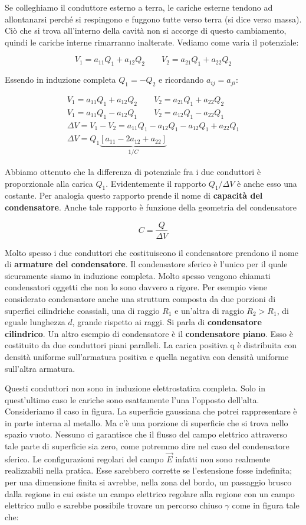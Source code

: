 Se colleghiamo il conduttore esterno a terra, le cariche esterne tendono ad allontanarsi perché si respingono e fuggono tutte verso terra (si dice verso massa). Ciò che si trova all'interno della cavità non si accorge di questo cambiamento, quindi le cariche interne rimarranno inalterate.
Vediamo come varia il potenziale:

\[
	V_1 = a_{11}Q_1 + a_{12}Q_2 \qquad V_2=a_{21}Q_1+a_{22}Q_2
\]

Essendo in induzione completa $ Q_1=-Q_2   $ e ricordando $ a_{ij}=a_{ji}   $:

\begin{gather*}
	V_1 = a_{11}Q_1 + a_{12}Q_2 \qquad V_2=a_{21}Q_1+a_{22}Q_2 \\
	V_1 = a_{11}Q_1 - a_{12}Q_1 \qquad V_2=a_{12}Q_1-a_{22}Q_1 \\
	\Delta V = V_1 - V_2 = a_{11}Q_1 - a_{12}Q_1  - a_{12}Q_1 + a_{22}Q_1  \\
	\Delta V = Q_1 \underbrace{[a_{11} - 2a_{12} + a_{22}]}_{1/C}
\end{gather*}

Abbiamo ottenuto che la differenza di potenziale fra i due conduttori è proporzionale alla carica $ Q_1  $. Evidentemente il rapporto $ Q_1/\Delta V  $ è anche esso una costante. Per analogia questo rapporto prende il nome di \textbf{capacità del condensatore}. Anche tale rapporto è funzione della geometria del condensatore

\[
	C = \frac{Q}{\Delta V}
\]

Molto spesso i due conduttori che costituiscono il condensatore prendono il nome di \textbf{armature del condensatore}. Il condensatore sferico è l'unico per il quale sicuramente siamo in induzione completa. Molto spesso vengono chiamati condensatori oggetti che non lo sono davvero a rigore. Per esempio viene considerato condensatore anche una struttura composta da due porzioni di superfici cilindriche coassiali, una di raggio $ R_1  $ e un'altra di raggio $ R_2 > R_1   $, di eguale lunghezza $d$, grande rispetto ai raggi. Si parla di \textbf{condensatore cilindrico}.
Un altro esempio di condensatore è il \textbf{condensatore piano}. Esso è costituito da due conduttori piani paralleli. La carica positiva q è distribuita con densità uniforme sull'armatura positiva e quella negativa con densità uniforme sull'altra armatura.

Questi conduttori non sono in induzione elettrostatica completa. Solo in quest'ultimo caso le cariche sono esattamente l'una l'opposto dell'alta. Consideriamo il caso in figura. La superficie gaussiana che potrei rappresentare è in parte interna al metallo. Ma c'è una porzione di superficie che si trova nello spazio vuoto. Nessuno ci garantisce che il flusso del campo elettrico attraverso tale parte di superficie sia zero, come potremmo dire nel caso del condensatore sferico. Le configurazioni regolari del campo $\vec{E}$ infatti non sono realmente realizzabili nella pratica. Esse sarebbero corrette se l'estensione fosse indefinita; per una dimensione finita si avrebbe, nella zona del bordo, un passaggio brusco dalla regione in cui esiste un campo elettrico regolare alla regione con un campo elettrico nullo e sarebbe possibile trovare un percorso chiuso $ \gamma  $ come in figura tale che:

